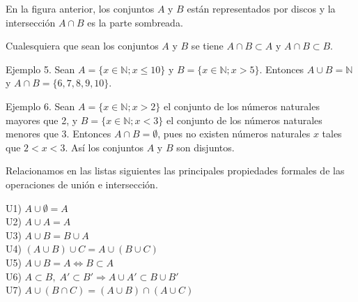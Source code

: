 \documentclass[12pt,oneside]{book}
\begin{document}
\begin{center}
  \centering
\end{center}

En la figura anterior, los conjuntos \(A\) y \(B\) están representados por discos y la intersección \(A \cap B\) es la parte sombreada.

Cualesquiera que sean los conjuntos \(A\) y \(B\) se tiene \(A \cap B \subset A\) y \(A \cap B \subset B\).

Ejemplo 5. Sean \(A = \{x \in \mathbb{N}; x \leq 10\}\) y \(B = \{x \in \mathbb{N}; x > 5\}\). Entonces \(A \cup B = \mathbb{N}\) y \(A \cap B = \{6, 7, 8, 9, 10\}\).

Ejemplo 6. Sean \(A = \{x \in \mathbb{N}; x > 2\}\) el conjunto de los números naturales mayores que 2, y \(B = \{x \in \mathbb{N}; x < 3\}\) el conjunto de los números naturales menores que 3. Entonces \(A \cap B = \emptyset\), pues no existen números naturales \(x\) tales que \(2 < x < 3\). Así los conjuntos \(A\) y \(B\) son disjuntos.

Relacionamos en las listas siguientes las principales propiedades formales de las operaciones de unión e intersección.

U1) \(A \cup \emptyset = A\)  \\
U2) \(A \cup A = A\)  \\
U3) \(A \cup B = B \cup A\)  \\
U4) \((A \cup B) \cup C = A \cup (B \cup C)\)  \\
U5) \(A \cup B = A \iff B \subset A\)  \\
U6) \(A \subset B,\; A' \subset B' \Rightarrow A \cup A' \subset B \cup B'\)  \\
U7) \(A \cup (B \cap C) = (A \cup B) \cap (A \cup C)\)
\end{document}

